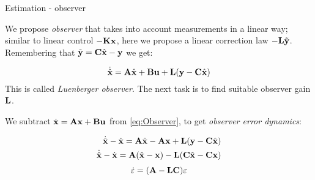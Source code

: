 \documentclass{beamer}
\begin{document}
\begin{frame}{Estimation - observer}
\begin{flushleft}

We propose \emph{observer} that takes into account measurements in a linear way; similar to linear control $-\mathbf{K}\mathbf{x}$, here we propose a linear correction law $-\mathbf{L}\Tilde{\mathbf{y}}$. Remembering that $\Tilde{\mathbf{y}} = \mathbf{C} \hat{\mathbf{x}} - \mathbf{y}$ we get:

\begin{equation}
\label{eq:Observer}
\dot{\hat{\mathbf{x}}}  = \mathbf{A} \hat{\mathbf{x}} + \mathbf{B} \mathbf{u} + \mathbf{L}(\mathbf{y} - \mathbf{C} \hat{\mathbf{x}})
\end{equation}
%
This is called \emph{Luenberger observer}. The next task is to find suitable observer gain $ \mathbf{L}$.

\bigskip

We subtract $\dot {\mathbf{x}} = \mathbf{A} \mathbf{x} + \mathbf{B} \mathbf{u}$ from \eqref{eq:Observer}, to get \emph{observer error dynamics}:

\begin{align}
\dot{\hat{\mathbf{x}}} - \dot {\mathbf{x}}= 
\mathbf{A} \hat{\mathbf{x}} - \mathbf{A} \mathbf{x} + 
\mathbf{L}(\mathbf y - \mathbf{C} \hat{\mathbf{x}})
\\
\dot{\hat{\mathbf{x}}} - \dot {\mathbf{x}}
= 
\mathbf{A} (\hat{\mathbf{x}} -  \mathbf{x} ) - 
\mathbf{L}(\mathbf{C} \hat{\mathbf{x}} -  \mathbf{C} \mathbf{x} ) 
\end{align}
%
\begin{equation}
\dot {\varepsilon}= 
(\mathbf{A} - \mathbf{L} \mathbf{C}) \varepsilon
\end{equation}

\end{flushleft}
\end{frame}
\end{document}
